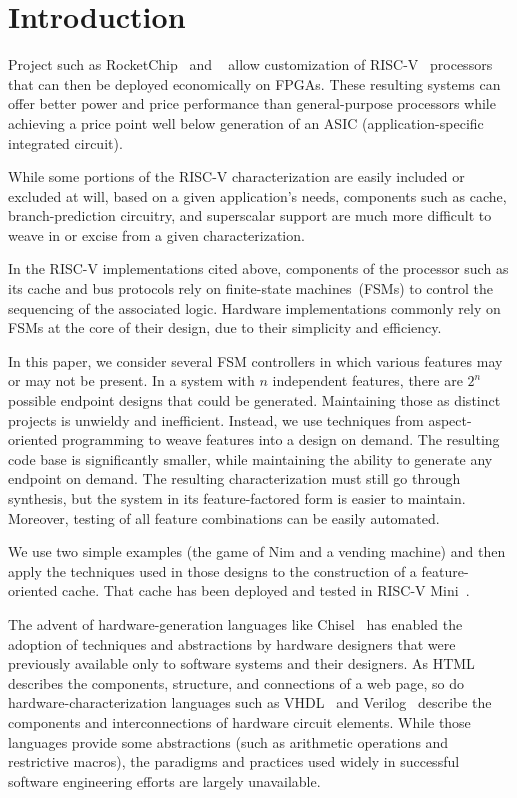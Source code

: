 \documentclass[conference]{IEEEtran}
\begin{document}
\maketitle

\section{Introduction}

Project such as RocketChip~\cite{rocketchip} and ~\cite{risvmini} allow customization of RISC-V~\cite{riscv} processors that can then be deployed economically on FPGAs.  These resulting systems can offer better power and price performance than general-purpose processors while achieving a price point well below generation of an ASIC (application-specific integrated circuit).

While some portions of the RISC-V characterization are easily included or excluded at will, based on a given application's needs, components such as cache, branch-prediction circuitry, and superscalar support are much more difficult to weave in or excise from a given characterization.

In the RISC-V implementations cited above, components of the processor such as its cache and bus protocols rely on finite-state machines~(FSMs) to control the sequencing of the associated logic.   Hardware implementations commonly rely on FSMs at the core of their design, due to their simplicity and efficiency.

In this paper, we consider several FSM controllers in which various features may or may not be present.  In a system with $n$ independent features, there are $2^n$ possible endpoint designs that could be generated.  Maintaining those as distinct projects is unwieldy and inefficient.  Instead, we use techniques from aspect-oriented programming to weave features into a design on demand.  The resulting code base is significantly smaller, while maintaining the ability to generate any endpoint on demand.   The resulting characterization must still go through synthesis, but the system in its feature-factored form is easier to maintain.  Moreover, testing of all feature combinations can be easily automated.

We use two simple examples (the game of Nim and a vending machine) and then apply the techniques used in those designs to the construction of a feature-oriented cache.  That cache has been deployed and tested in RISC-V Mini~\cite{riscvmini}.

The advent of hardware-generation languages like Chisel~\cite{chisel:article} has enabled the adoption of techniques and abstractions by hardware designers that were previously available only to software systems and their designers. As HTML describes the components, structure, and connections of a web page, so do hardware-characterization languages such as VHDL~\cite{vhdl} and Verilog~\cite{verilog} describe the components and interconnections of hardware circuit elements. While those languages provide some abstractions (such as arithmetic operations and restrictive macros), the paradigms and practices used widely in successful software engineering efforts are largely unavailable.
\end{document}

